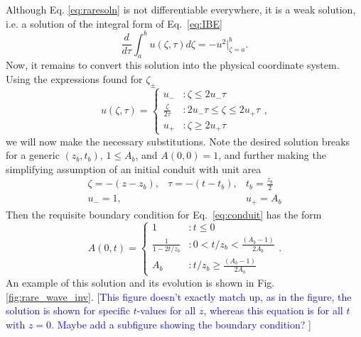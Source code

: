 \documentclass{jfm}
\newcommand{\MM}[1]{[\textcolor{blue}{#1 }]}
\begin{document}
Although Eq. \ref{eq:raresoln} is not differentiable everywhere, it is a weak solution, i.e. a solution of the integral form of Eq.~\ref{eq:IBE}
    \begin{equation}
       \frac{d}{d\tau} \int_a^b u(\zeta,\tau)d\zeta = -u^2\Big|_{\zeta=a}^b.
    \end{equation}
Now, it remains to convert this solution into the physical coordinate system. 
Using the expressions found for $\zeta_\pm$
\begin{equation}
   u(\zeta,\tau) = \begin{cases}
               u_- & : \zeta\le 2u_-\tau  \\
               \frac{\zeta}{2\tau} & : 2u_-\tau \le \zeta \le 2u_+\tau\\
               u_+ & :\zeta\ge 2u_+\tau
            \end{cases},
\end{equation}
we will now make the necessary substitutions. Note the desired solution breaks for a generic $(z_b,t_b)$, $ 1 \le A_b$, and $A(0,0) = 1$, and further making the simplifying assumption of an initial conduit with unit area
\begin{equation} \label{eq:coordSub1}
\begin{array}{ccc}
    \zeta = -(z-z_b), & \tau = -(t-t_b) ,& t_b = \frac{z_b}{2}\\
    u_- = 1 , &                    &u_+ = A_b 
\end{array}
\end{equation}
Then the requisite boundary condition for Eq.~\ref{eq:conduit} has the form
\begin{equation}\label{eq:BCDSW}
   A(0,t) = 
     \begin{cases}
       1                    & :                        t \le 0                          \\
       \frac{1}{1-2t/z_b}  & :  0 < t/z_b < \frac{(A_b - 1)}{2A_b}          \\
       A_b                  & :        t/z_b \ge  \frac{(A_b - 1)}{2A_b}
     \end{cases}.
\end{equation}
An example of this solution and its evolution is shown in Fig. \ref{fig:rare_wave_inv}. \MM{This figure doesn't exactly match up, as in the figure, the solution is shown for specific $t$-values for all $z$, whereas this equation is for all $t$ with $z=0$. Maybe add a subfigure showing the boundary condition?}
\end{document}
